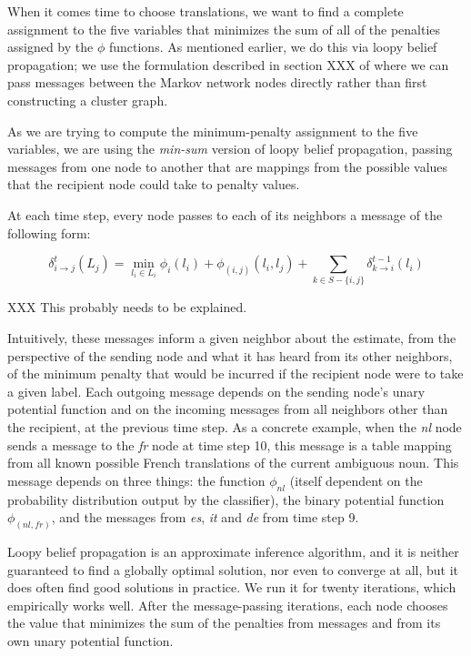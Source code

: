 \documentclass[11pt,letterpaper]{article}
\begin{document}
When it comes time to choose translations, we want to find a complete
assignment to the five variables that minimizes the sum of all of the penalties
assigned by the $\phi$ functions. As mentioned earlier, we do this via loopy
belief propagation; we use the formulation described in section XXX of
\cite{Koller+Friedman:09} where we can pass messages between the Markov network
nodes directly rather than first constructing a cluster graph.

As we are trying to compute the minimum-penalty assignment to the five
variables, we are using the \emph{min-sum} version of loopy belief propagation,
passing messages from one node to another that are mappings from the possible
values that the recipient node could take to penalty values.

At each time step, every node passes to each of its neighbors a message of the
following form:

\begin{dmath}
\delta_{i \rightarrow j}^{t} (L_j) =
  \min_{l_i \in L_i}
  \phi_i(l_i) +
  \phi_{(i,j)}(l_i, l_j) +
  \sum_{k \in S - \lbrace i,j \rbrace}
  \delta_{k \rightarrow i}^{t-1} (l_i)
\end{dmath}

XXX This probably needs to be explained.

Intuitively, these messages inform a given neighbor about the estimate, from
the perspective of the sending node and what it has heard from its other
neighbors, of the minimum penalty that would be incurred if the recipient node
were to take a given label. Each outgoing message depends on the sending node's
unary potential function and on the incoming messages from all neighbors other
than the recipient, at the previous time step. As a concrete example, when the
\emph{nl} node sends a message to the \emph{fr} node at time step 10, this
message is a table mapping from all known possible French translations of
the current ambiguous noun. This message depends on three things: the function
$\phi_{nl}$ (itself dependent on the probability distribution output by the
classifier), the binary potential function $\phi_{(nl,fr)}$, and the messages
from \emph{es}, \emph{it} and \emph{de} from time step 9. 

Loopy belief propagation is an approximate inference algorithm, and it is
neither guaranteed to find a globally optimal solution, nor even to converge at
all, but it does often find good solutions in practice. We run it for twenty
iterations, which empirically works well. After the message-passing iterations,
each node chooses the value that minimizes the sum of the penalties from
messages and from its own unary potential function.
\end{document}
